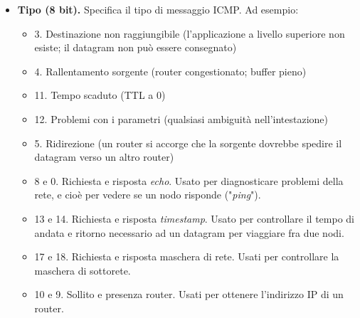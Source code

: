        \begin{itemize}
            \item 
                \textbf{Tipo (8 bit).} Specifica il tipo di messaggio ICMP. Ad esempio:
                    \begin{itemize}
                        \item 
                            3. Destinazione non raggiungibile (l'applicazione a livello superiore non esiste; il datagram non può essere consegnato)
                            
                        \item 
                            4. Rallentamento sorgente (router congestionato; buffer pieno)
                            
                        \item 
                            11. Tempo scaduto (TTL a 0)
                            
                        \item 
                            12. Problemi con i parametri (qualsiasi ambiguità nell'intestazione)
                            
                        \item 
                            5. Ridirezione (un router si accorge che la sorgente dovrebbe spedire il datagram verso un altro router)
                            
                        \item
                            8 e 0. Richiesta e risposta \textit{echo}. Usato per diagnosticare problemi della rete, e cioè per vedere se un nodo risponde ("\textit{ping}").
                        
                        \item 
                            13 e 14. Richiesta e risposta \textit{timestamp}. Usato per controllare il tempo di andata e ritorno necessario ad un datagram per viaggiare fra due nodi.
                            
                        \item
                            17 e 18. Richiesta e risposta maschera di rete. Usati per controllare la maschera di sottorete.
                            
                        \item
                            10 e 9. Sollito e presenza router. Usati per ottenere l'indirizzo IP di un router.
                    \end{itemize}
            

\end{itemize}
